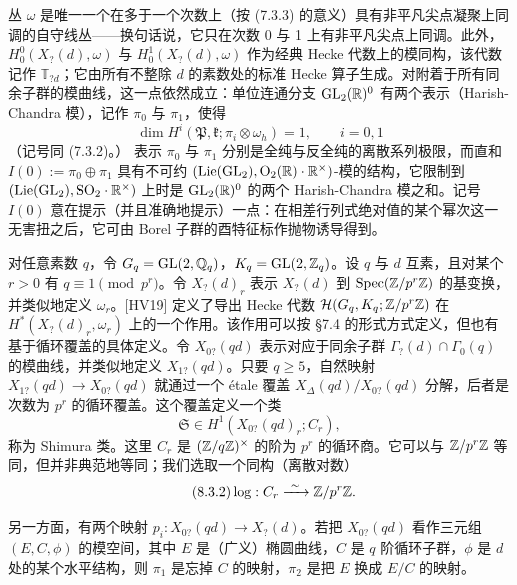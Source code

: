 丛 $\omega$ 是唯一一个在多于一个次数上（按 (7.3.3) 的意义）具有非平凡尖点凝聚上同调的自守线丛——换句话说，它只在次数 0 与 1 上有非平凡尖点上同调。此外，$H^0_0(X_?(d),\omega)$ 与 $H^1_0(X_?(d),\omega)$ 作为经典 Hecke 代数上的模同构，该代数记作 $\mathbb T_{?d}$；它由所有不整除 $d$ 的素数处的标准 Hecke 算子生成。对附着于所有同余子群的模曲线，这一点依然成立：单位连通分支 $\mathrm{GL}_2(\mathbb{R})^0$ 有两个表示（Harish-Chandra 模），记作 $\pi_0$ 与 $\pi_1$，使得
\[
\dim H^i(\mathfrak P,\mathfrak k;\pi_i\otimes\omega_h)=1,\qquad i=0,1
\]
（记号同 (7.3.2)。）
表示 $\pi_0$ 与 $\pi_1$ 分别是全纯与反全纯的离散系列极限，而直和 $I(0):=\pi_0\oplus\pi_1$ 具有不可约 $(\mathrm{Lie}(\mathrm{GL}_2),\mathrm O_2(\mathbb{R})\cdot\mathbb{R}^\times)$-模的结构，它限制到 $(\mathrm{Lie}(\mathrm{GL}_2),\mathrm{SO}_2\cdot\mathbb{R}^\times)$ 上时是 $\mathrm{GL}_2(\mathbb{R})^0$ 的两个 Harish-Chandra 模之和。记号 $I(0)$ 意在提示（并且准确地提示）一点：在相差行列式绝对值的某个幂次这一无害扭之后，它可由 Borel 子群的酉特征标作抛物诱导得到。

对任意素数 $q$，令 $G_q=\mathrm{GL}(2,\mathbb{Q}_q)$，$K_q=\mathrm{GL}(2,\mathbb{Z}_q)$。设 $q$ 与 $d$ 互素，且对某个 $r>0$ 有 $q\equiv1\pmod{p^r}$。令 $X_?(d)_r$ 表示 $X_?(d)$ 到 $\operatorname{Spec}(\mathbb{Z}/p^r\mathbb{Z})$ 的基变换，并类似地定义 $\omega_r$。[HV19] 定义了导出 Hecke 代数 $\mathcal H(G_q,K_q;\mathbb{Z}/p^r\mathbb{Z})$ 在 $H^*(X_?(d)_r,\omega_r)$ 上的一个作用。该作用可以按 §7.4 的形式方式定义，但也有基于循环覆盖的具体定义。令 $X_{0?}(qd)$ 表示对应于同余子群 $\Gamma_?(d)\cap\Gamma_0(q)$ 的模曲线，并类似地定义 $X_{1?}(qd)$。只要 $q\ge5$，自然映射 $X_{1?}(qd)\to X_{0?}(qd)$ 就通过一个 \'etale 覆盖 $X_\Delta(qd)/X_{0?}(qd)$ 分解，后者是次数为 $p^r$ 的循环覆盖。这个覆盖定义一个类
\begin{equation}\tag{8.3.1}\label{eq:a6-05-9}
\mathfrak S\in H^1(X_{0?}(qd)_r;C_r),
\end{equation}
称为 Shimura 类。这里 $C_r$ 是 $(\mathbb{Z}/q\mathbb{Z})^\times$ 的阶为 $p^r$ 的循环商。它可以与 $\mathbb{Z}/p^r\mathbb{Z}$ 等同，但并非典范地等同；我们选取一个同构（离散对数）
\begin{equation}\tag{8.3.2}\label{eq:a6-05-10}
\log:C_r\xrightarrow{\ \sim\ }\mathbb{Z}/p^r\mathbb{Z}.
\end{equation}

另一方面，有两个映射 $p_i:X_{0?}(qd)\to X_?(d)$。若把 $X_{0?}(qd)$ 看作三元组 $(E,C,\phi)$ 的模空间，其中 $E$ 是（广义）椭圆曲线，$C$ 是 $q$ 阶循环子群，$\phi$ 是 $d$ 处的某个水平结构，则 $\pi_1$ 是忘掉 $C$ 的映射，$\pi_2$ 是把 $E$ 换成 $E/C$ 的映射。

